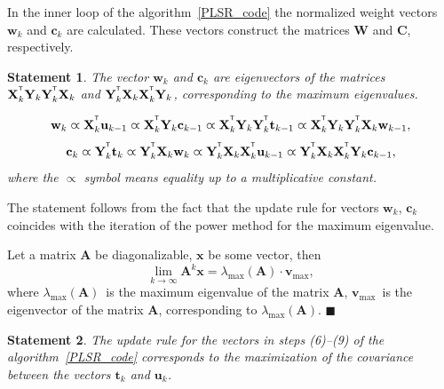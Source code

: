 \documentclass[12pt,twoside]{article}
\newtheorem{statement}{Statement}
\newcommand{\bx}{\mathbf{x}}
\newcommand{\bw}{\mathbf{w}}
\newcommand{\bY}{\mathbf{Y}}
\newcommand{\bX}{\mathbf{X}}
\newcommand{\bu}{\mathbf{u}}
\newcommand{\bt}{\mathbf{t}}
\newcommand{\bc}{\mathbf{c}}
\newcommand{\bC}{\mathbf{C}}
\newcommand{\bW}{\mathbf{W}}
\newcommand{\T}{^{\text{\tiny\sffamily\upshape\mdseries T}}}
\begin{document}
In the inner loop of the algorithm~\ref{PLSR_code} the normalized weight vectors $\bw_k$ and $\bc_k$ are calculated. 
These vectors construct the matrices $\bW$ and $\bC$, respectively.

\begin{statement}
	The vector $\bw_k$ and $\bc_k$ are eigenvectors of the matrices $\bX_k^{\T} \bY_k \bY_k^{\T} \bX_k$ and $\bY_k^{\T} \bX_k \bX_k^{\T} \bY_k$, corresponding to the maximum eigenvalues.
	
	\begin{equation*}
	\bw_k \varpropto \bX_k^{\T} \bu_{k-1} \varpropto \bX_k^{\T} \bY_k \bc_{k-1} \varpropto \bX_k^{\T} \bY_k \bY_k^{\T} \bt_{k-1} \varpropto \bX_k^{\T} \bY_k \bY_k^{\T} \bX_k \bw_{k-1},
	\end{equation*}
	\begin{equation*}
	\bc_k \varpropto \bY_k^{\T} \bt_k \varpropto \bY_k^{\T} \bX_k \bw_k \varpropto \bY_k^{\T} \bX_k \bX_k^{\T} \bu_{k-1} \varpropto \bY_k^{\T} \bX_k \bX_k^{\T} \bY_k \bc_{k-1},
	\end{equation*}
	where the $\varpropto$ symbol means equality up to a multiplicative constant.
	\label{st::eig}
\end{statement}

The statement follows from the fact that the update rule for vectors $\bw_k$, $\bc_k$ coincides with the iteration of the power method for the maximum eigenvalue.

Let a matrix $\mathbf{A}$ be diagonalizable, $\bx$ be some vector, then
\[
	\lim_{k \rightarrow \infty} \mathbf{A}^k \bx = \lambda_{\max}(\mathbf{A}) \cdot \mathbf{v}_{\max},
\]
where $ \lambda_{\max} (\mathbf{A})$~is the maximum eigenvalue of the matrix $\mathbf{A}$, $\mathbf{v}_{\max}$~is the eigenvector of the matrix $\mathbf{A}$, corresponding to $ \lambda_{\max} (\mathbf{A})$.
$\blacksquare$

\begin{statement}

The update rule for the vectors in steps (6)--(9) of the algorithm~\ref{PLSR_code} corresponds to the maximization of the covariance between the vectors $\bt_k$ and $\bu_k$.
\end{statement}
\end{document}
